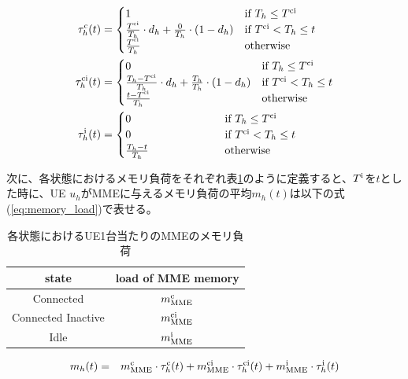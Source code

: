 \documentclass[a4j]{ujarticle}
\begin{document}
\begin{align}
	\tau^{\rm c}_h(t) & =
	\begin{cases}
    1 \hphantom{100000000000000} & \text{if $T_h \le T^{\rm ci}$}\\
    \frac{T^{\rm ci}}{T_h} \cdot d_h + \frac{0}{T_h} \cdot (1 - d_h)& \text{if $T^{\rm ci} < T_h \le t$}\\
    \frac{T^{\rm ci}}{T_h} & \text{otherwise}
  \end{cases} \label{eq:connected_alpha}\\
	\tau^{\rm ci}_h(t) & =
  \begin{cases}
    0 \hphantom{100000000000000} & \text{if $T_h \le T^{\rm ci}$}\\
		\frac{T_h - T^{\rm ci}}{T_h} \cdot d_h + \frac{T_h}{T_h} \cdot (1 - d_h) & \text{if $T^{\rm ci} < T_h \le t$}\\
    \frac{t - T^{\rm ci}}{T_h} & \text{otherwise}
  \end{cases} \label{eq:inactive_alpha}\\
	\tau^{\rm i}_h(t) & =
  \begin{cases}
    0 \hphantom{100000000000000} & \text{if $T_h \le T^{\rm ci}$}\\
		0 & \text{if $T^{\rm ci} < T_h \le t$}\\
    \frac{T_h - t}{T_h} & \text{otherwise}
  \end{cases}\label{eq:idle_alpha}
\end{align}

次に、各状態におけるメモリ負荷をそれぞれ表\ref{table:state_memory}のように定義すると、$T^{\rm i}$を$t$とした時に、UE $u_h$がMMEに与えるメモリ負荷の平均$m_h(t)$は以下の式(\ref{eq:memory_load})で表せる。


\begin{table}[h]
 \caption{各状態におけるUE1台当たりのMMEのメモリ負荷}
 \label{table:state_memory}
 \centering
  \begin{tabular}{cc}
   \hline
   state & load of MME memory \\
   \hline \hline
   Connected & $m^{\rm c}_{\rm MME}$ \\
   Connected Inactive & $m^{\rm ci}_{\rm MME}$ \\
   Idle & $m^{\rm i}_{\rm MME}$ \\
   \hline
  \end{tabular}
\end{table}

\begin{eqnarray}
  m_h(t) & = & m^{\rm c}_{\rm MME} \cdot \tau^{\rm c}_h(t) + m^{\rm ci}_{\rm MME} \cdot \tau^{\rm ci}_h(t) + m^{\rm i}_{\rm MME} \cdot \tau^{\rm i}_h(t) \label{eq:memory_load}
\end{eqnarray}
\end{document}
